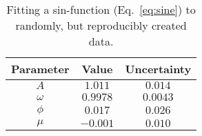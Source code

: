 \begin{table}
\centering
\caption{Fitting a sin-function (Eq.~\ref{eq:sine}) to randomly, but reproducibly created data.}
\label{tab:sin_fit_x_y}
\begin{tabular}{ccc}
\hline\hline
Parameter & Value & Uncertainty \\
\hline
$A$ & $1.011$ & $0.014$ \\
$\omega$ & $0.9978$ & $0.0043$ \\
$\phi$ & $0.017$ & $0.026$ \\
$\mu$ & $-0.001$ & $0.010$ \\
\hline\hline
\end{tabular}
\end{table}
